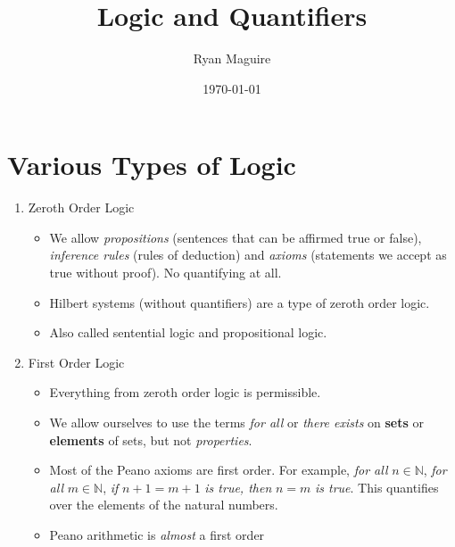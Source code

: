 \documentclass{article}
\title{Logic and Quantifiers}
\author{Ryan Maguire}
\date{\today}
\begin{document}
    \maketitle
    \section{Various Types of Logic}
        \begin{enumerate}
            \item
                Zeroth Order Logic
                \begin{itemize}
                    \item
                        We allow \textit{propositions} (sentences that can be
                        affirmed  true or false), \textit{inference rules}
                        (rules of deduction) and \textit{axioms} (statements we
                        accept as true without proof). No quantifying at all.
                    \item
                        Hilbert systems (without quantifiers) are a type of
                        zeroth order logic.
                    \item
                        Also called sentential logic and propositional logic.
                \end{itemize}
            \item
                First Order Logic
                \begin{itemize}
                    \item
                        Everything from zeroth order logic is permissible.
                    \item
                        We allow ourselves to use the terms \textit{for all}
                        or \textit{there exists} on \textbf{sets} or
                        \textbf{elements} of sets, but not
                        \textit{properties}.
                    \item
                        Most of the Peano axioms are first order. For example,
                        \textit{for all} $n\in\mathbb{N}$, \textit{for all}
                        $m\in\mathbb{N}$, \textit{if} $n+1=m+1$
                        \textit{is true, then} $n=m$ \textit{is true}.
                        This quantifies over the elements of the
                        natural numbers.
                    \item
                        Peano arithmetic is \textit{almost} a first order

\end{itemize}
\end{enumerate}
\end{document}
